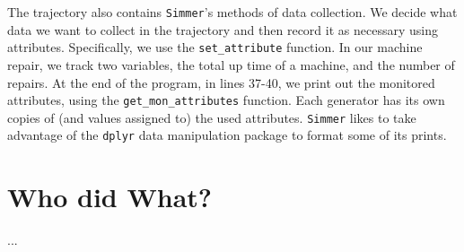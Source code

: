 \documentclass[a4paper, 11pt]{article} %
\begin{document}
The trajectory also contains \texttt{Simmer}'s methods of data collection. We decide what data we want to collect in the trajectory and then record it as necessary using attributes. Specifically, we use the \texttt{set\_attribute} function. In our machine repair, we track two variables, the total up time of a machine, and the number of repairs. At the end of the program, in lines 37-40, we print out the monitored attributes, using the \texttt{get\_mon\_attributes} function. Each generator has its own copies of (and values assigned to) the used attributes. \texttt{Simmer} likes to take advantage of the \texttt{dplyr} data manipulation package to format some of its prints. \newline


\pagebreak


\pagebreak


\section{Who did What?}

...

\end{document}
